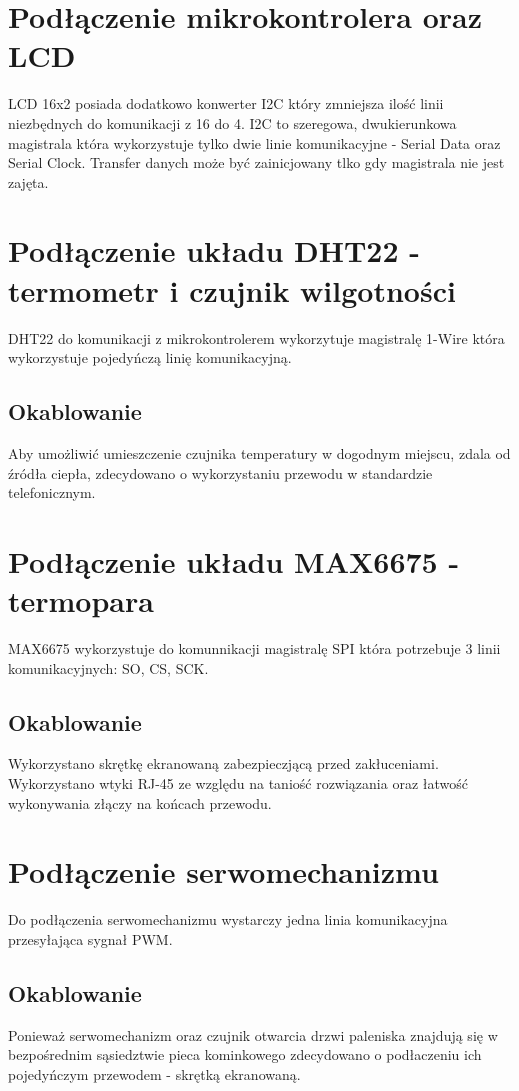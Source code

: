 \documentclass[12pt]{report}
\begin{document}
 \section{Podłączenie mikrokontrolera oraz LCD}
 LCD 16x2 posiada dodatkowo konwerter I2C który zmniejsza ilość linii niezbędnych do komunikacji z 16 do 4.
 I2C to szeregowa, dwukierunkowa magistrala która wykorzystuje tylko dwie linie komunikacyjne - Serial Data oraz Serial Clock. Transfer danych może być zainicjowany tlko gdy magistrala nie jest zajęta.
  
 \section{Podłączenie układu DHT22 - termometr i czujnik wilgotności}
 DHT22 do komunikacji z mikrokontrolerem wykorzytuje magistralę 1-Wire która wykorzystuje pojedyńczą linię komunikacyjną.
 \subsection{Okablowanie}
Aby umożliwić umieszczenie czujnika temperatury w dogodnym miejscu, zdala od źródła ciepła, zdecydowano o wykorzystaniu przewodu w standardzie telefonicznym.
 
 \section{Podłączenie układu MAX6675 - termopara}
 MAX6675 wykorzystuje do komunnikacji magistralę SPI która potrzebuje 3 linii komunikacyjnych: SO, CS, SCK.
 \subsection{Okablowanie}
 Wykorzystano skrętkę ekranowaną zabezpieczjącą przed zakłuceniami.
 Wykorzystano wtyki RJ-45 ze względu na taniość rozwiązania oraz łatwość wykonywania złączy na końcach przewodu.
 
 \section{Podłączenie serwomechanizmu}
 Do podłączenia serwomechanizmu wystarczy jedna linia komunikacyjna przesyłająca sygnał PWM.
 \subsection{Okablowanie}
 Ponieważ serwomechanizm oraz czujnik otwarcia drzwi paleniska znajdują się w bezpośrednim sąsiedztwie pieca kominkowego zdecydowano o podłaczeniu ich pojedyńczym przewodem - skrętką ekranowaną.
 
\end{document}
